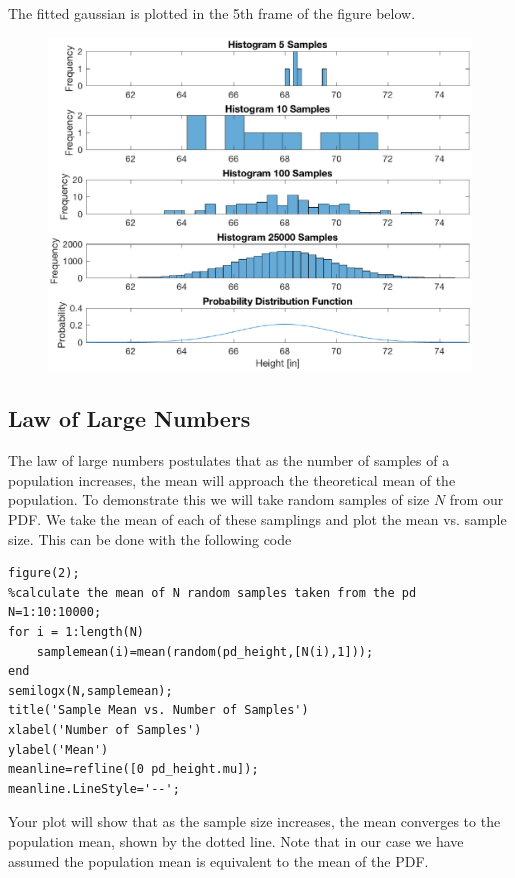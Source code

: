 \documentclass[12pt]{article}
\begin{document}
The fitted gaussian is plotted in the 5th frame of the figure below. 

\begin{figure}[H]
\centering
\includegraphics[width=0.75\linewidth]{matlab/dataHeightWeight/heightHistograms.eps}
\end{figure}

\subsection{Law of Large Numbers}

The law of large numbers postulates that as the number of samples of a population increases, the mean will approach the theoretical mean of the population. To demonstrate this we will take random samples of size $N$ from our PDF. We take the mean of each of these samplings and plot the mean vs. sample size. This can be done with the following code

\begin{lstlisting}[frame=single]
figure(2);
%calculate the mean of N random samples taken from the pd
N=1:10:10000;
for i = 1:length(N)
    samplemean(i)=mean(random(pd_height,[N(i),1]));
end
semilogx(N,samplemean);
title('Sample Mean vs. Number of Samples')
xlabel('Number of Samples')
ylabel('Mean')
meanline=refline([0 pd_height.mu]);
meanline.LineStyle='--';
\end{lstlisting}

Your plot will show that as the sample size increases, the mean converges to the population mean, shown by the dotted line. Note that in our case we have assumed the population mean is equivalent to the mean of the PDF.
\end{document}
